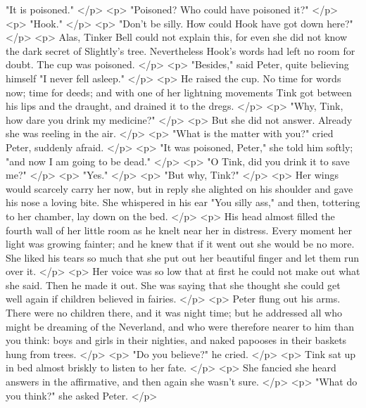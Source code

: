       "It is poisoned."
    </p>
    <p>
      "Poisoned? Who could have poisoned it?"
    </p>
    <p>
      "Hook."
    </p>
    <p>
      "Don't be silly. How could Hook have got down here?"
    </p>
    <p>
      Alas, Tinker Bell could not explain this, for even she did not know the
      dark secret of Slightly's tree. Nevertheless Hook's words had left no room
      for doubt. The cup was poisoned.
    </p>
    <p>
      "Besides," said Peter, quite believing himself "I never fell asleep."
    </p>
    <p>
      He raised the cup. No time for words now; time for deeds; and with one of
      her lightning movements Tink got between his lips and the draught, and
      drained it to the dregs.
    </p>
    <p>
      "Why, Tink, how dare you drink my medicine?"
    </p>
    <p>
      But she did not answer. Already she was reeling in the air.
    </p>
    <p>
      "What is the matter with you?" cried Peter, suddenly afraid.
    </p>
    <p>
      "It was poisoned, Peter," she told him softly; "and now I am going to be
      dead."
    </p>
    <p>
      "O Tink, did you drink it to save me?"
    </p>
    <p>
      "Yes."
    </p>
    <p>
      "But why, Tink?"
    </p>
    <p>
      Her wings would scarcely carry her now, but in reply she alighted on his
      shoulder and gave his nose a loving bite. She whispered in his ear "You
      silly ass," and then, tottering to her chamber, lay down on the bed.
    </p>
    <p>
      His head almost filled the fourth wall of her little room as he knelt near
      her in distress. Every moment her light was growing fainter; and he knew
      that if it went out she would be no more. She liked his tears so much that
      she put out her beautiful finger and let them run over it.
    </p>
    <p>
      Her voice was so low that at first he could not make out what she said.
      Then he made it out. She was saying that she thought she could get well
      again if children believed in fairies.
    </p>
    <p>
      Peter flung out his arms. There were no children there, and it was night
      time; but he addressed all who might be dreaming of the Neverland, and who
      were therefore nearer to him than you think: boys and girls in their
      nighties, and naked papooses in their baskets hung from trees.
    </p>
    <p>
      "Do you believe?" he cried.
    </p>
    <p>
      Tink sat up in bed almost briskly to listen to her fate.
    </p>
    <p>
      She fancied she heard answers in the affirmative, and then again she
      wasn't sure.
    </p>
    <p>
      "What do you think?" she asked Peter.
    </p>
